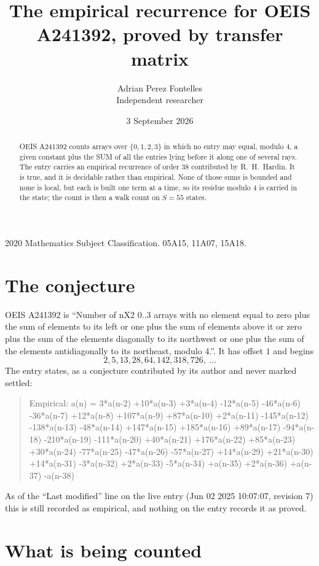 \documentclass[11pt,a4paper]{article}
\title{The empirical recurrence for OEIS A241392, proved by transfer matrix}
\author{Adrian Perez Fontelles\\ \small Independent researcher}
\date{3 September 2026}
\theoremstyle{plain}
\theoremstyle{definition}
\begin{document}
\maketitle

\begin{abstract}
OEIS A241392 counts arrays over $\{0,1,2,3\}$ in which no entry may equal, modulo $4$, a given
constant plus the SUM of all the entries lying before it along one of several rays. The entry
carries an empirical recurrence of order $38$ contributed by R.~H.~Hardin. It is true, and
it is decidable rather than empirical. None of those sums is bounded and none is local, but
each is built one term at a time, so its residue modulo $4$ is carried in the state; the
count is then a walk count on $S=55$ states.
\end{abstract}

\noindent\small 2020 Mathematics Subject Classification. 05A15, 11A07, 15A18.\normalsize

\section{The conjecture}

OEIS A241392 is ``Number of nX2 0..3 arrays with no element equal to zero plus the sum of elements to its left or one plus the sum of elements above it or zero plus the sum of the elements diagonally to its northwest or one plus the sum of the elements antidiagonally to its northeast, modulo 4.''. It has offset $1$ and begins
\[
2, 5, 13, 28, 64, 142, 318, 726,\ \dots
\]
The entry states, as a conjecture contributed by its author and never marked settled:
\begin{quote}
Empirical: a(n) = 3*a(n-2) +10*a(n-3) +3*a(n-4) -12*a(n-5) -46*a(n-6) -36*a(n-7) +12*a(n-8) +107*a(n-9) +87*a(n-10) +2*a(n-11) -145*a(n-12) -138*a(n-13) -48*a(n-14) +147*a(n-15) +185*a(n-16) +89*a(n-17) -94*a(n-18) -210*a(n-19) -111*a(n-20) +40*a(n-21) +176*a(n-22) +85*a(n-23) +30*a(n-24) -77*a(n-25) -47*a(n-26) -57*a(n-27) +14*a(n-29) +21*a(n-30) +14*a(n-31) -3*a(n-32) +2*a(n-33) -5*a(n-34) +a(n-35) +2*a(n-36) +a(n-37) -a(n-38)
\end{quote}
As of the ``Last modified'' line on the live entry (Jun 02 2025 10:07:07, revision 7) this is still
recorded as empirical, and nothing on the entry records it as proved.

\section{What is being counted}
\end{document}
